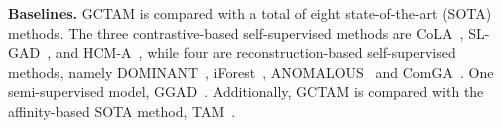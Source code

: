 \documentclass{article}
\begin{document}
\noindent\textbf{Baselines.}
GCTAM is compared with a total of eight state-of-the-art (SOTA) methods. The three contrastive-based self-supervised methods are CoLA~\cite{Cola_liu2021anomaly}, SL-GAD~\cite{SL_GAD_zheng2021generative}, and HCM-A~\cite{huang2021hop}, while four are reconstruction-based self-supervised methods, namely DOMINANT~\cite{dominant_ding2019deep}, iForest~\cite{liu2012isolation}, ANOMALOUS~\cite{ANOMALOUS_peng2018anomalous} and ComGA~\cite{ComGA_luo2022comga}. One semi-supervised model, GGAD~\cite{semi_qiao2024generative}. Additionally, GCTAM is compared with the affinity-based SOTA method, TAM~\cite{TAM_qiao2024truncated}.

\end{document}
